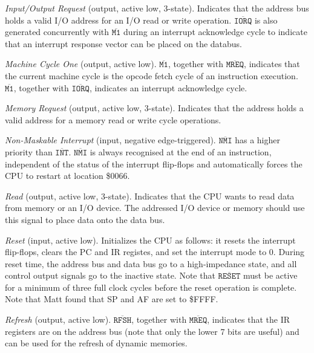 \documentclass[12pt,twoside,openright,a4paper]{book}
\begin{document}
\begin{description}[leftmargin=1.5em]
	\item[$\mathtt{\overline{IORQ}}$]
	{\em Input/Output Request} (output, active low, 3-state). Indicates that the address bus holds a valid I/O address for an I/O read or write operation. $\mathtt{\overline{IORQ}}$ is also generated concurrently with $\mathtt{\overline{M1}}$ during an interrupt acknowledge cycle to indicate that an interrupt response vector can be placed on the databus.

	\item[$\mathtt{\overline{M1}}$]
	{\em Machine Cycle One} (output, active low). $\mathtt{\overline{M1}}$, together with $\mathtt{\overline{MREQ}}$, indicates that the current machine cycle is the opcode fetch cycle of an instruction execution. $\mathtt{\overline{M1}}$, together with $\mathtt{\overline{IORQ}}$, indicates an interrupt acknowledge cycle.

	\item[$\mathtt{\overline{MREQ}}$]
	{\em Memory Request} (output, active low, 3-state). Indicates that the address holds a valid address for a memory read or write cycle operations.

	\item[$\mathtt{\overline{NMI}}$]
	{\em Non-Maskable Interrupt} (input, negative edge-triggered). $\mathtt{\overline{NMI}}$ has a higher priority than $\mathtt{\overline{INT}}$. $\mathtt{\overline{NMI}}$ is always recognised at the end of an instruction, independent of the status of the interrupt flip-flops and automatically forces the CPU to restart at location \$0066.

	\item[$\mathtt{\overline{RD}}$]
	{\em Read} (output, active low, 3-state). Indicates that the CPU wants to read data from memory or an I/O device. The addressed I/O device or memory should use this signal to place data onto the data bus.

	\item[$\mathtt{\overline{RESET}}$]
	{\em Reset} (input, active low). Initializes the CPU as follows: it resets the interrupt flip-flops, clears the PC and IR registes, and set the interrupt mode to 0. During reset time, the address bus and data bus go to a high-impedance state, and all control output signals go to the inactive state. Note that $\mathtt{\overline{RESET}}$ must be active for a minimum of three full clock cycles before the reset operation is complete. Note that Matt found that SP and AF are set to \$FFFF.

	\item[$\mathtt{\overline{RFSH}}$]
	{\em Refresh} (output, active low). $\mathtt{\overline{RFSH}}$, together with $\mathtt{\overline{MREQ}}$, indicates that the IR registers are on the address bus (note that only the lower 7 bits are useful) and can be used for the refresh of dynamic memories.


\end{description}
\end{document}
